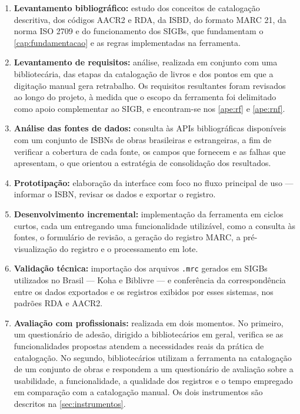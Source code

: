 \begin{enumerate}
    \item \textbf{Levantamento bibliográfico:} estudo dos conceitos de catalogação descritiva, dos códigos AACR2 e RDA, da ISBD, do formato MARC 21, da norma ISO 2709 e do funcionamento dos SIGBs, que fundamentam o \autoref{cap:fundamentacao} e as regras implementadas na ferramenta.
    \item \textbf{Levantamento de requisitos:} análise, realizada em conjunto com uma bibliotecária, das etapas da catalogação de livros e dos pontos em que a digitação manual gera retrabalho. Os requisitos resultantes foram revisados ao longo do projeto, à medida que o escopo da ferramenta foi delimitado como apoio complementar ao SIGB, e encontram-se nos \autoref{ape:rf} e \autoref{ape:rnf}.
    \item \textbf{Análise das fontes de dados:} consulta às APIs bibliográficas disponíveis com um conjunto de ISBNs de obras brasileiras e estrangeiras, a fim de verificar a cobertura de cada fonte, os campos que fornecem e as falhas que apresentam, o que orientou a estratégia de consolidação dos resultados.
    \item \textbf{Prototipação:} elaboração da interface com foco no fluxo principal de uso --- informar o ISBN, revisar os dados e exportar o registro.
    \item \textbf{Desenvolvimento incremental:} implementação da ferramenta em ciclos curtos, cada um entregando uma funcionalidade utilizável, como a consulta às fontes, o formulário de revisão, a geração do registro MARC, a pré-visualização do registro e o processamento em lote.
    \item \textbf{Validação técnica:} importação dos arquivos \texttt{.mrc} gerados em SIGBs utilizados no Brasil --- Koha e Biblivre --- e conferência da correspondência entre os dados exportados e os registros exibidos por esses sistemas, nos padrões RDA e AACR2.
    \item \textbf{Avaliação com profissionais:} realizada em dois momentos. No primeiro, um questionário de adesão, dirigido a bibliotecários em geral, verifica se as funcionalidades propostas atendem a necessidades reais da prática de catalogação. No segundo, bibliotecários utilizam a ferramenta na catalogação de um conjunto de obras e respondem a um questionário de avaliação sobre a usabilidade, a funcionalidade, a qualidade dos registros e o tempo empregado em comparação com a catalogação manual. Os dois instrumentos são descritos na \autoref{sec:instrumentos}.
\end{enumerate}

